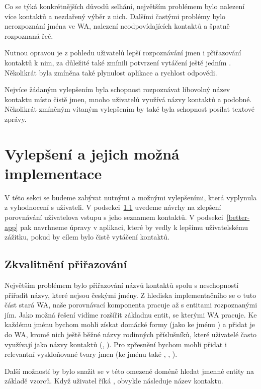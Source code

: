 Co se týká konkrétnějších důvodů selhání, největším problémem bylo nalezení více
kontaktů a nezdařený výběr z nich. Dalšími častými problémy bylo nerozpoznání
jména ve WA, nalezení neodpovídajících kontaktů a špatně rozpoznaná řeč.

Nutnou opravou je z pohledu uživatelů lepší rozpoznávání jmen i přiřazování
kontaktů k nim, za důležité také zmínili potvrzení vytáčení ještě jedním
. Několikrát byla zmíněna také plynulost aplikace a rychlost
odpovědi.

Nejvíce žádaným vylepšením byla schopnost rozpoznávat libovolný název kontaktu
místo čistě jmen, mnoho uživatelů využívá názvy kontaktů  a podobné.
Několikrát zmíněným vítaným vylepšením by také byla schopnost posílat textové
zprávy.

\section{Vylepšení a jejich možná implementace}\label{improvements}

V této sekci se budeme zabývat nutnými a možnými vylepšeními, která
vyplynula z vyhodnocení s uživateli. V podsekci~\ref{better-match}
uvedeme návrhy na zlepšení porovnávání uživatelova vstupu s jeho
seznamem kontaktů. V podsekci~\ref{better-app} pak navrhneme
úpravy v aplikaci, které by vedly k lepšímu uživatelskému
zážitku, pokud by cílem bylo čistě vytáčení kontaktů.

\subsection{Zkvalitnění přiřazování}\label{better-match}

Největším problémem bylo přiřazování názvů kontaktů spolu s neschopností přiřadit
názvy, které nejsou českými jmény. Z hlediska implementačního se o tuto část
stará WA, naše porovnávací komponenta pracuje až s entitami rozpoznanými jím.
Jako možná řešení vidíme rozšířit základnu entit, se kterými WA pracuje. Ke
každému jménu bychom mohli získat domácké formy (jako  ke jménu )
a přidat je do WA, kromě nich ještě běžné názvy rodinných příslušníků,
které uživatelé často využívají jako názvy kontaktů (, ).
Pro zpřesnění bychom mohli přidat i relevantní vyskloňované tvary jmen (ke jménu 
také , , ).

Další možností by bylo snažit se v této omezené doméně hledat jmenné entity na
základě vzorců. Když uživatel říká , obvykle následuje název
kontaktu.

